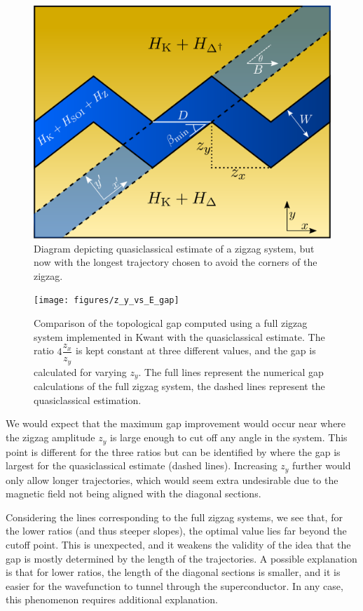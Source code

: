 			\begin{figure}
			\centering
			\includegraphics[width=0.45\columnwidth]{images/longest_trajectory_wo_corners}
			\caption{Diagram depicting quasiclassical estimate of a zigzag system, but now with the longest trajectory chosen to avoid the corners of the zigzag.}
			\label{fig:quasiclassical_approximation}
			\end{figure}

			\begin{figure}[!htb]
			\centering
			\texttt{[image: figures/z\_y\_vs\_E\_gap]}
			\caption{Comparison of the topological gap computed using a full zigzag system implemented in Kwant with the quasiclassical estimate.
			The ratio $4\dfrac{z_x}{z_y}$ is kept constant at three different values, and the gap is calculated for varying $z_y$.
			The full lines represent  the numerical gap calculations of the full zigzag system, the dashed lines represent the quasiclassical estimation.}
			\label{fig:quasiclassical_approximation}
			\end{figure}

			We would expect that the maximum gap improvement would occur near where the zigzag amplitude $z_y$ is large enough to cut off any angle in the system.
			This point is different for the three ratios but can be identified by where the gap is largest for the quasiclassical estimate (dashed lines).
			Increasing $z_y$ further would only allow longer trajectories, which would seem extra undesirable due to the magnetic field not being aligned with the diagonal sections.
			
			Considering the lines corresponding to the full zigzag systems, we see that, for the lower ratios (and thus steeper slopes), the optimal value lies far beyond the cutoff point.
			This is unexpected, and it weakens the validity of the idea that the gap is mostly determined by the length of the trajectories.
			A possible explanation is that for lower ratios, the length of the diagonal sections is smaller, and it is easier for the wavefunction to tunnel through the superconductor.
			In any case, this phenomenon requires additional explanation.

